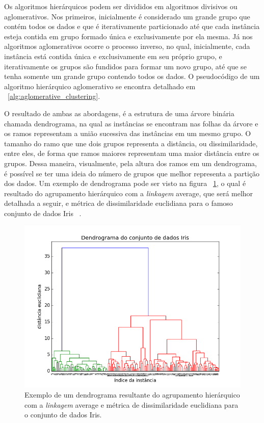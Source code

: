 Os algoritmos hierárquicos podem ser divididos em algoritmos divisivos ou aglomerativos. Nos primeiros, inicialmente é considerado um grande grupo que contém todos os dados e que é iterativamente particionado até que cada instância esteja contida em grupo formado única e exclusivamente por ela mesma. Já nos algoritmos aglomerativos ocorre o processo inverso, no qual, inicialmente, cada instância está contida única e exclusivamente em seu próprio grupo, e iterativamente os grupos são fundidos para formar um novo grupo, até que se tenha somente um grande grupo contendo todos os dados. O pseudocódigo de um algoritmo hierárquico aglomerativo se encontra detalhado em ~\ref{alg:aglomerative_clustering}.

O resultado de ambas as abordagens, é a estrutura de uma árvore binária chamada dendrograma, na qual as instâncias se encontram nas folhas da árvore e os ramos representam a união sucessiva das instâncias em um mesmo grupo. O tamanho do ramo que une dois grupos representa a distância, ou dissimilaridade, entre eles, de forma que ramos maiores representam uma maior distância entre os grupos. Dessa maneira, visualmente, pela altura dos ramos em um dendrograma, é possível se ter uma ideia do número de grupos que melhor representa a partição dos dados. Um exemplo de dendrograma pode ser visto na figura ~\ref{fig:dendrograma_exemplo}, o qual é resultado do agrupamento hierárquico com a \emph{linkagem} average, que será melhor detalhada a seguir, e métrica de dissimilaridade euclidiana para o famoso conjunto de dados Iris ~\parencite{Iris}.

\begin{figure}[h!]
	\includegraphics[width=\linewidth]{figuras/dendrograma_exemplo.png}
	\caption{Exemplo de um dendrograma resultante do agrupamento hierárquico com a \emph{linkagem} average e métrica de dissimilaridade euclidiana para o conjunto de dados Iris.}
	\label{fig:dendrograma_exemplo}
\end{figure}

